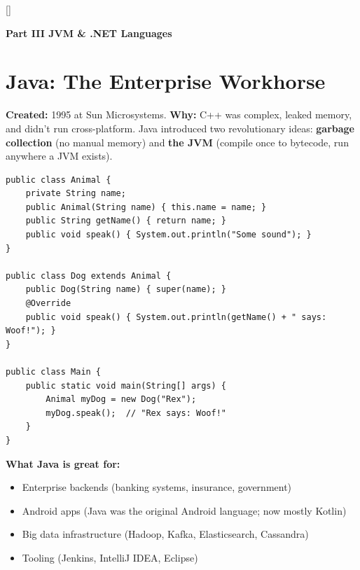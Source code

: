 \documentclass[11pt, letterpaper]{article}
\newcommand{\bluesections}{%
  \titleformat{\section}{\large\bfseries\color{sectionblue}}{}{0em}{}[\color{sectionblue}\titlerule]%
  \titleformat{\subsection}{\normalsize\bfseries\color{sectionblue!80!black}}{}{0em}{}%
}
\newcommand{\partbanner}[3]{%
  \begin{tcolorbox}[colback=#1, colframe=#2, boxrule=1.2pt, arc=4pt,
    left=8pt, right=8pt, top=6pt, bottom=6pt]
    \begin{center}{\LARGE\bfseries #3}\end{center}
  \end{tcolorbox}%
}
\begin{document}
\newpage

\bluesections
{}
\partbanner{partbg}{sectionblue}{Part III \quad JVM \& .NET Languages}

\vspace{8pt}

\section*{Java: The Enterprise Workhorse}

\textbf{Created:} 1995 at Sun Microsystems. \textbf{Why:} C++ was complex, leaked memory, and didn't run cross-platform. Java introduced two revolutionary ideas: \textbf{garbage collection} (no manual memory) and \textbf{the JVM} (compile once to bytecode, run anywhere a JVM exists).

\begin{lstlisting}[style=code, caption={Java: classes and inheritance}]
public class Animal {
    private String name;
    public Animal(String name) { this.name = name; }
    public String getName() { return name; }
    public void speak() { System.out.println("Some sound"); }
}

public class Dog extends Animal {
    public Dog(String name) { super(name); }
    @Override
    public void speak() { System.out.println(getName() + " says: Woof!"); }
}

public class Main {
    public static void main(String[] args) {
        Animal myDog = new Dog("Rex");
        myDog.speak();  // "Rex says: Woof!"
    }
}
\end{lstlisting}

\textbf{What Java is great for:}
\begin{itemize}[noitemsep]
  \item Enterprise backends (banking systems, insurance, government)
  \item Android apps (Java was the original Android language; now mostly Kotlin)
  \item Big data infrastructure (Hadoop, Kafka, Elasticsearch, Cassandra)
  \item Tooling (Jenkins, IntelliJ IDEA, Eclipse)
\end{itemize}
\end{document}
